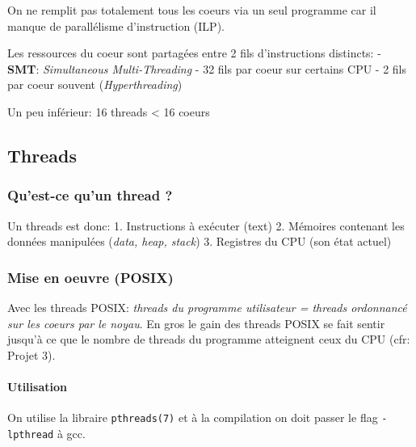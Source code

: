 On ne remplit pas totalement tous les coeurs via un seul programme car
il manque de parallélisme d'instruction (ILP).

Les ressources du coeur sont partagées entre 2 fils d'instructions
distincts: - \textbf{SMT}: \emph{Simultaneous Multi-Threading} - 32 fils
par coeur sur certains CPU - 2 fils par coeur souvent
(\emph{Hyperthreading})

Un peu inférieur: 16 threads \textless{} 16 coeurs

\subsection{Threads}\label{threads}

\subsubsection{Qu'est-ce qu'un thread ?}\label{quest-ce-quun-thread}

Un threads est donc: 1. Instructions à exécuter (text) 2. Mémoires
contenant les données manipulées (\emph{data, heap, stack}) 3. Registres
du CPU (son état actuel)

\subsubsection{Mise en oeuvre (POSIX)}\label{mise-en-oeuvre-posix}

Avec les threads POSIX: \emph{threads du programme utilisateur = threads
ordonnancé sur les coeurs par le noyau}. En gros le gain des threads
POSIX se fait sentir jusqu'à ce que le nombre de threads du programme
atteignent ceux du CPU (cfr: Projet 3).

\paragraph{Utilisation}\label{utilisation}

On utilise la libraire \texttt{pthreads(7)} et à la compilation on doit
passer le flag \texttt{-lpthread} à gcc.

\begin{Shaded}
\begin{Highlighting}[]

\OperatorTok{(}\OperatorTok{*}\OperatorTok{,}
                   \OperatorTok{*}\OperatorTok{,}
                    \OperatorTok{*(*}\OperatorTok{)(} \OperatorTok{*),}
                    \OperatorTok{*}\OperatorTok{);}
\end{Highlighting}
\end{Shaded}

